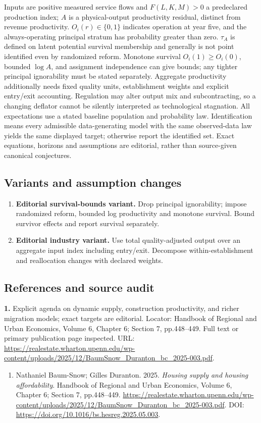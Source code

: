 \documentclass[11pt,a4paper]{article}
\begin{document}
Inputs are positive measured service flows and \(F(L,K,M)>0\) a predeclared production index; \(A\) is a physical-output productivity residual, distinct from revenue productivity. \(O_i(r)\in\{0,1\}\) indicates operation at year five, and the always-operating principal stratum has probability greater than zero. \(\tau_A\) is defined on latent potential survival membership and generally is not point identified even by randomized reform. Monotone survival \(O_i(1)\geq O_i(0)\), bounded \(\log A\), and assignment independence can give bounds; any tighter principal ignorability must be stated separately. Aggregate productivity additionally needs fixed quality units, establishment weights and explicit entry/exit accounting. Regulation may alter output mix and subcontracting, so a changing deflator cannot be silently interpreted as technological stagnation. All expectations use a stated baseline population and probability law. Identification means every admissible data-generating model with the same observed-data law yields the same displayed target; otherwise report the identified set. Exact equations, horizons and assumptions are editorial, rather than source-given canonical conjectures.
\subsection*{Variants and assumption changes}
\begin{enumerate}
\item \textbf{Editorial survival-bounds variant.} Drop principal ignorability; impose randomized reform, bounded log productivity and monotone survival. Bound survivor effects and report survival separately.
\item \textbf{Editorial industry variant.} Use total quality-adjusted output over an aggregate input index including entry/exit. Decompose within-establishment and reallocation changes with declared weights.
\end{enumerate}
\subsection*{References and source audit}
\textbf{1.} Explicit agenda on dynamic supply, construction productivity, and richer migration models; exact targets are editorial. Locator: Handbook of Regional and Urban Economics, Volume 6, Chapter 6; Section 7, pp.448–449. Full text or primary publication page inspected. URL: \url{https://realestate.wharton.upenn.edu/wp-content/uploads/2025/12/BaumSnow_Duranton_bc_2025-003.pdf}.
\begin{enumerate}\raggedright
\item\hypertarget{definitions:source:30007744:1}{} Nathaniel Baum-Snow; Gilles Duranton. 2025. \emph{Housing supply and housing affordability}. Handbook of Regional and Urban Economics, Volume 6, Chapter 6; Section 7, pp.448–449.
\url{https://realestate.wharton.upenn.edu/wp-content/uploads/2025/12/BaumSnow_Duranton_bc_2025-003.pdf}.
DOI: \url{https://doi.org/10.1016/bs.hesreg.2025.05.003}.
\end{enumerate}
\end{document}

